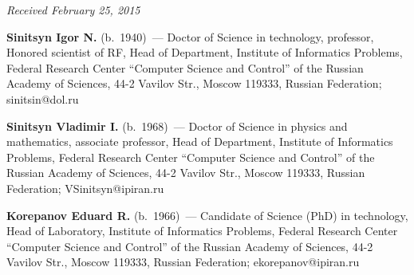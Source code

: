 \vspace*{-3pt}

\hfill{\small\textit{Received February 25, 2015}}

\vspace*{-9pt}

\Contr

\noindent
\textbf{Sinitsyn Igor N.} (b.\ 1940)~--- Doctor of Science in 
technology, professor, Honored scientist of RF, Head of Department, 
Institute of Informatics Problems, Federal Research Center ``Computer Science and Control'' of the Russian Academy of Sciences, 44-2 Vavilov Str., Moscow 119333, Russian Federation; sinitsin@dol.ru

\vspace*{3pt}


     \noindent
\textbf{Sinitsyn Vladimir I.} (b.\ 1968)~--- Doctor 
of Science in physics and mathematics, associate professor, 
Head of Department, Institute of Informatics Problems, Federal Research Center ``Computer Science and Control'' of the Russian Academy of Sciences, 44-2 Vavilov Str., Moscow 119333, Russian Federation; VSinitsyn@ipiran.ru

\vspace*{3pt}

    \noindent
\textbf{Korepanov Eduard R.} (b.\ 1966)~--- Candidate of Science (PhD) in technology, Head of Laboratory, Institute of Informatics Problems, Federal Research Center ``Computer Science and Control'' of the Russian Academy of Sciences, 44-2 Vavilov Str., Moscow 119333, Russian Federation; ekorepanov@ipiran.ru


\label{end\stat}


\renewcommand{\bibname}{\protect\rm Литература} 